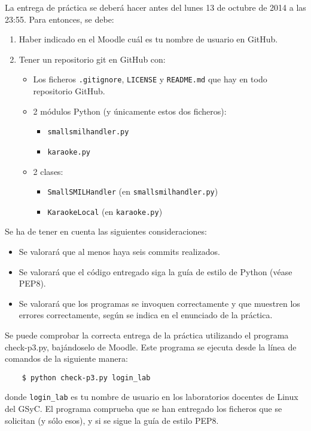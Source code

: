 \documentclass[11pt,a4paper]{article}
\begin{document}
La entrega de práctica se deberá hacer antes del lunes 13 de octubre de 2014 a las 23:55. Para entonces, se debe: 

\begin{enumerate}
  \item Haber indicado en el Moodle cuál es tu nombre de usuario en GitHub.
  \item Tener un repositorio git en GitHub con:
  \begin{itemize}
    \item Los ficheros \texttt{.gitignore}, \texttt{LICENSE} y \texttt{README.md} que hay en todo repositorio GitHub.
    \item 2 módulos Python (y únicamente estos dos ficheros):
    \begin{itemize}
      \item \texttt{smallsmilhandler.py}
      \item \texttt{karaoke.py}
    \end{itemize}
    \item 2 clases:
    \begin{itemize}
      \item \texttt{SmallSMILHandler} (en \texttt{smallsmilhandler.py})
      \item \texttt{KaraokeLocal} (en \texttt{karaoke.py})
    \end{itemize}
  \end{itemize}
\end{enumerate}

Se ha de tener en cuenta las siguientes consideraciones:
\begin{itemize}
  \item Se valorará que al menos haya seis commits realizados.
  \item Se valorará que el código entregado siga la guía de estilo de Python (véase PEP8).
  \item Se valorará que los programas se invoquen correctamente y que muestren los errores correctamente, según se indica en el enunciado de la práctica.
\end{itemize}

Se puede comprobar la correcta entrega de la práctica utilizando el programa check-p3.py, bajándoselo de Moodle. Este programa se ejecuta desde la línea de comandos de la siguiente manera:
\begin{verbatim}
	$ python check-p3.py login_lab
\end{verbatim}

donde \texttt{login\_lab} es tu nombre de usuario en los laboratorios docentes de Linux del GSyC. El programa comprueba que se han entregado los ficheros que se solicitan (y sólo esos), y si se sigue la guía de estilo PEP8. 




\end{document}
